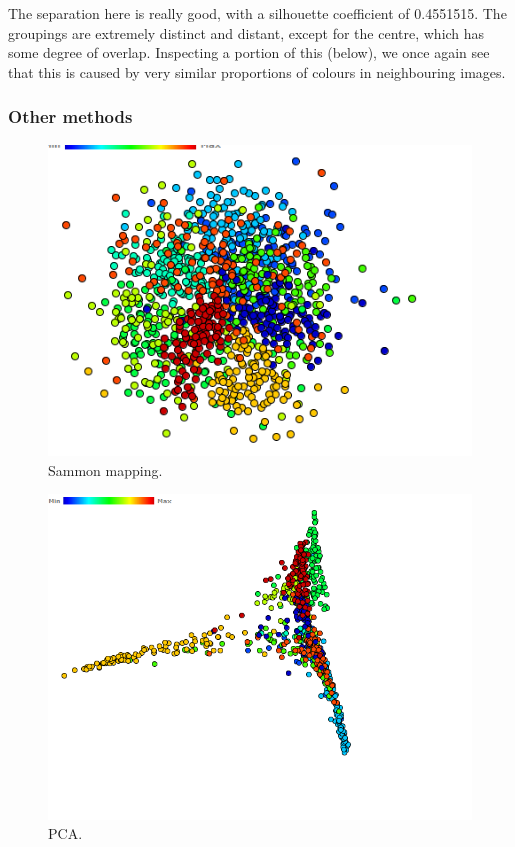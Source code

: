 \documentclass[ 10pt ]{fphw}
\begin{document}
The separation here is really good, with a silhouette coefficient of 0.4551515. The groupings are extremely distinct and distant, except for the centre, which has some degree of overlap. Inspecting a portion of this (below), we once again see that this is caused by very similar proportions of colours in neighbouring images.

\subsubsection*{Other methods}

\begin{center}
\begin{figure}[H]
    \centering
	\includegraphics[width=0.95\columnwidth]{sammon.PNG} 
	\caption{Sammon mapping.}
	\label{fig:sammon}
	\end{figure}
\end{center}

\begin{center}
\begin{figure}[H]
    \centering
	\includegraphics[width=0.95\columnwidth]{pca.PNG} 
	\caption{PCA.}
	\label{fig:pca}
	\end{figure}
\end{center}
\end{document}

